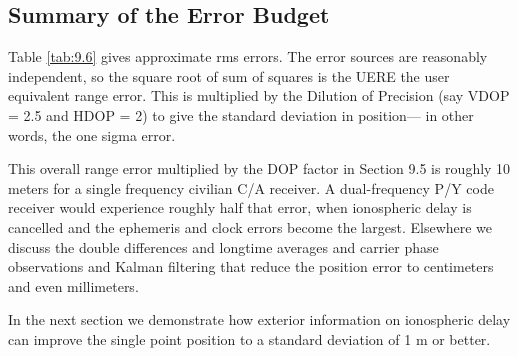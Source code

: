 	\subsection{Summary of the Error Budget}
	Table \ref{tab:9.6} gives approximate rms errors. The error sources are reasonably independent, so the square root of sum of squares is the UERE the user equivalent range error. This is multiplied by the Dilution of Precision (say VDOP = 2.5 and HDOP = 2) to give the standard deviation in position— in other words, the one sigma error.
	
	This overall range error multiplied by the DOP factor in Section 9.5 is roughly 10 meters for a single frequency  civilian C/A receiver. A dual-frequency P/Y code receiver would experience roughly half that error, when ionospheric delay is cancelled and the ephemeris and clock errors become the largest. Elsewhere we discuss the double differences and longtime averages and carrier phase observations and Kalman filtering that reduce the position error to centimeters and even millimeters.
	
	In the next section we demonstrate how exterior information on ionospheric delay can improve the single point position to a standard deviation of 1 m or better.
